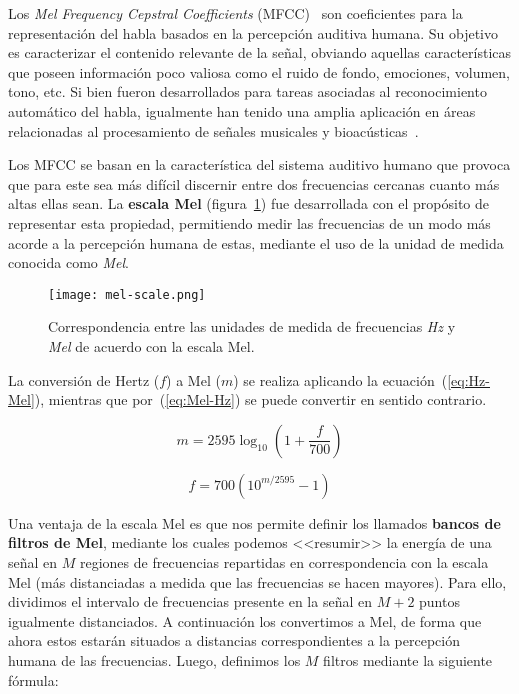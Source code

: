 Los \textit{Mel Frequency Cepstral Coefficients} (MFCC)~\cite{Davis80} son coeficientes para la representación del habla basados en la percepción auditiva humana.
Su objetivo es caracterizar el contenido relevante de la señal, obviando aquellas características que poseen información poco valiosa como el ruido de fondo, emociones, volumen, tono, etc.
Si bien fueron desarrollados para tareas asociadas al reconocimiento automático del habla, igualmente han tenido una amplia aplicación en áreas relacionadas al procesamiento de señales musicales y bioacústicas~\cite{McKinney03,Dufour14,Clemins05,Lee06,Li01,Cowling03,Mitrovic06,Fagerlund07}.

Los MFCC se basan en la característica del sistema auditivo humano que provoca que para este sea más difícil discernir entre dos frecuencias cercanas cuanto más altas ellas sean.
La \textbf{escala Mel} (figura~\ref{img:mel-scale}) fue desarrollada con el propósito de representar esta propiedad, permitiendo medir las frecuencias de un modo más acorde a la percepción humana de estas, mediante el uso de la unidad de medida conocida como \textit{Mel}.

\begin{figure}[!h]
    \centering
    \texttt{[image: mel-scale.png]}
    \caption{Correspondencia entre las unidades de medida de frecuencias \textit{Hz} y \textit{Mel} de acuerdo con la escala Mel.}
    \label{img:mel-scale}
\end{figure}

La conversión de Hertz ($f$) a Mel ($m$) se realiza aplicando la ecuación~(\ref{eq:Hz-Mel}), mientras que por~(\ref{eq:Mel-Hz}) se puede convertir en sentido contrario.

\begin{equation}
    \label{eq:Hz-Mel}
    m = 2595\log_{10}\left( 1 + \frac{f}{700} \right)
\end{equation}

\begin{equation}
    \label{eq:Mel-Hz}
    f = 700\left( 10^{m/2595} - 1 \right)
\end{equation}

Una ventaja de la escala Mel es que nos permite definir los llamados \textbf{bancos de filtros de Mel}, mediante los cuales podemos <<resumir>> la energía de una señal en $M$ regiones de frecuencias repartidas en correspondencia con la escala Mel (más distanciadas a medida que las frecuencias se hacen mayores).
Para ello, dividimos el intervalo de frecuencias presente en la señal en $M+2$ puntos igualmente distanciados.
A continuación los convertimos a Mel, de forma que ahora estos estarán situados a distancias correspondientes a la percepción humana de las frecuencias.
Luego, definimos los $M$ filtros mediante la siguiente fórmula:

